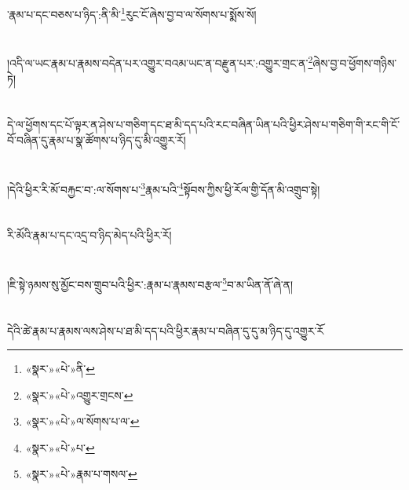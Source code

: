 ་རྣམ་པ་དང་བཅས་པ་ཉིད་:ནི་མི་\footnote{«སྣར་»«པེ་»ནི་}རུང་ངོ་ཞེས་བྱ་བ་ལ་སོགས་པ་སྨོས་སོ།\chapter{ }།འདི་ལ་ཡང་རྣམ་པ་རྣམས་བདེན་པར་འགྱུར་བའམ་ཡང་ན་བརྫུན་པར་:འགྱུར་གྲང་ན་\footnote{«སྣར་»«པེ་»འགྱུར་གྲངས་}ཞེས་བྱ་བ་ཕྱོགས་གཉིས་ཏེ།\chapter{ }དེ་ལ་ཕྱོགས་དང་པོ་ལྟར་ན་ཤེས་པ་གཅིག་དང་ཐ་མི་དད་པའི་རང་བཞིན་ཡིན་པའི་ཕྱིར་ཤེས་པ་གཅིག་གི་རང་གི་ངོ་བོ་བཞིན་དུ་རྣམ་པ་སྣ་ཚོགས་པ་ཉིད་དུ་མི་འགྱུར་རོ།\chapter{ }།དེའི་ཕྱིར་རི་མོ་བརྐྱང་བ་:ལ་སོགས་པ་\footnote{«སྣར་»«པེ་»ལ་སོགས་པ་ལ་}རྣམ་པའི་\footnote{«སྣར་»«པེ་»པ་}སྟོབས་ཀྱིས་ཕྱི་རོལ་གྱི་དོན་མི་འགྲུབ་སྟེ།\chapter{ }རི་མོའི་རྣམ་པ་དང་འདྲ་བ་ཉིད་མེད་པའི་ཕྱིར་རོ།\chapter{ }།ཇི་སྟེ་ཉམས་སུ་མྱོང་བས་གྲུབ་པའི་ཕྱིར་:རྣམ་པ་རྣམས་བརྩལ་\footnote{«སྣར་»«པེ་»རྣམ་པ་གསལ་}བ་མ་ཡིན་ནོ་ཞེ་ན།\chapter{ }དེའི་ཚེ་རྣམ་པ་རྣམས་ལས་ཤེས་པ་ཐ་མི་དད་པའི་ཕྱིར་རྣམ་པ་བཞིན་དུ་དུ་མ་ཉིད་དུ་འགྱུར་རོ